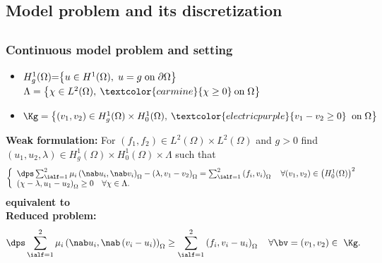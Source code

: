 \documentclass{beamer}
\begin{document}
\begin{frame}
\section{Model problem and its discretization}
\subsection{}  
\frametitle{Continuous model problem and setting}
\begin{itemize}
\item $H_g^1(\Omega)\hspace{-0.1 cm} =\hspace{-0.1 cm} \left\{u\in H^1(\Omega), \hspace{0.1 cm} u=g \hspace{0.1 cm} \mbox{on} \hspace{0.1 cm} \partial \Omega\right\}$ \quad $\Lambda=\left\{\chi\in L^2(\Omega), \: \textcolor{carmine}{\chi \geq 0} \: \mbox{on} \hspace{0.1 cm} \Omega\right\}$
\item
$\Kg= \left\{(v_1,v_2)\in H_g^1(\Omega)\times H_0^1(\Omega),\: \textcolor{electricpurple}{v_1-v_2 \geq 0} \; \; \mbox{on} 
\hspace{0.1 cm} \Omega \right\}$
\end{itemize}
\textbf{Weak formulation:}
For $(f_1,f_2)\in L^2(\Omega)\times L^2 (\Omega)$ and $g > 0$ find $(u_1,u_2,\lambda)\in H_g^1(\Omega)\times H_0^1(\Omega) \times \Lambda$ such that
\begin{equation*}
\left\lbrace\begin{array}{llccc}
\dps \sum_{\ialf=1}^2 \mu_i \left(\nab u_i,\nab v_i\right)_{\Omega} - \left(\lambda,v_1-v_2\right)_{\Omega} = \sum_{\ialf=1}^2\left(f_i,v_i\right)_{\Omega} \quad \forall (v_1,v_2) \in \left(H_0^1(\Omega)\right)^2 \\
\left(\chi - \lambda,u_1-u_2\right)_{\Omega} \geq 0 
\quad \forall \chi \in \Lambda.
\end{array}
\right.
\end{equation*}
\hspace{4.5 cm}\textcolor{cadmiumgreen}{\textbf{equivalent to}}\\
\textbf{Reduced problem:}
\begin{equation*}
\dps \sum_{\ialf=1}^2 \mu_i \left(\nab u_i,\nab \left(v_i-u_i\right)\right)_{\Omega} \geq \sum_{\ialf=1}^2\left(f_i,v_i-u_i\right)_{\Omega} \quad \forall \bv = (v_1,v_2)\in ~\Kg.
\end{equation*}


\end{frame}
\end{document}
